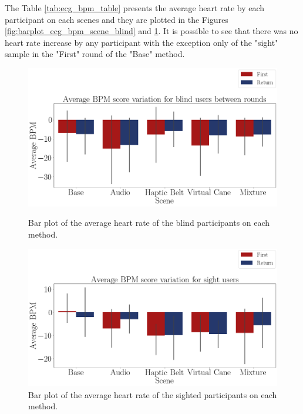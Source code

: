 The Table \ref{tab:ecg_bpm_table} presents the average heart rate by each participant on each scenes and they are plotted in the Figures \ref{fig:barplot_ecg_bpm_scene_blind} and \ref{fig:barplot_ecg_bpm_scene_sight}. It is possible to see that there was no heart rate increase by any participant with the exception only of the "sight" sample in the "First" round of the "Base" method.



\begin{figure}[!htb]
    \centering
    \begin{minipage}{\textwidth}
        \centering
        \includegraphics[width = 0.8\linewidth]{Resultados/ECG/Figuras/png/barplot_ecg_bpm_scene_blind.png}
        \caption{Bar plot of the average heart rate of the blind participants on each method.}
        \label{fig:barplot_ecg_bpm_scene_blind}
    \end{minipage}
    \begin{minipage}{\textwidth}
        \centering
        \includegraphics[width = 0.8\linewidth]{Resultados/ECG/Figuras/png/barplot_ecg_bpm_scene_sight.png}
        \caption{Bar plot of the average heart rate of the sighted participants on each method.}
        \label{fig:barplot_ecg_bpm_scene_sight}
    \end{minipage}
\end{figure}


